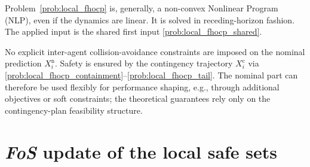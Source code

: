 \documentclass[twocolumn]{autart}
\begin{document}
\setcounter{equation}{15}

Problem~\eqref{prob:local_fhocp} is, generally, a non-convex Nonlinear Program (NLP), even if the dynamics are linear. It is solved in receding-horizon fashion. The applied input is the shared first input
\eqref{prob:local_fhocp_shared}.

\begin{remark}
No explicit inter-agent collision-avoidance constraints are imposed on the nominal prediction
\(X_i^\mathrm n\). Safety is ensured by the contingency trajectory
\(X_i^\mathrm c\) via
\eqref{prob:local_fhocp_containment}--\eqref{prob:local_fhocp_tail}. The nominal part can therefore be used flexibly for performance shaping, e.g., through additional objectives or soft constraints; the theoretical guarantees rely only on the contingency-plan feasibility structure.
\end{remark}

\section{\textit{FoS} update of the local safe sets}
\label{sec:FreezeandshiftOperator}
\end{document}
